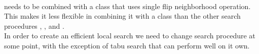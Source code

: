 \DecMargin{1em} \\
 needs to be combined with a  class that uses single flip neighborhood operation. 
This makes it less flexible in combining it with a  class than the other search procedures 
, , and . \\ 
In order to create an efficient local search we need to change search procedure at some point, with the exception of 
tabu search that can perform well on it own. 



